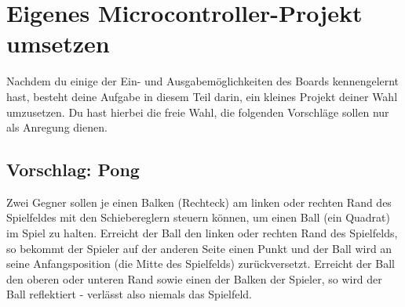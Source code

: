 \clearpage
\section{\ExercisePrefixEmbeddedC Eigenes Microcontroller-Projekt umsetzen \optional}

\optionaltextboxC

Nachdem du einige der Ein- und Ausgabemöglichkeiten des Boards kennengelernt hast, besteht deine Aufgabe in diesem Teil darin, ein kleines Projekt deiner Wahl umzusetzen.
Du hast hierbei die freie Wahl, die folgenden Vorschläge sollen nur als Anregung dienen.

\subsection*{Vorschlag: Pong}
Zwei Gegner sollen je einen Balken (Rechteck) am linken oder rechten Rand des Spielfeldes mit den Schiebereglern steuern können, um einen Ball (ein Quadrat) im Spiel zu halten.
Erreicht der Ball den linken oder rechten Rand des Spielfelds, so bekommt der Spieler auf der anderen Seite einen Punkt und der Ball wird an seine Anfangsposition (die Mitte des Spielfelds) zurückversetzt.
Erreicht der Ball den oberen oder unteren Rand sowie einen der Balken der Spieler, so wird der Ball reflektiert - verlässt also niemals das Spielfeld.


